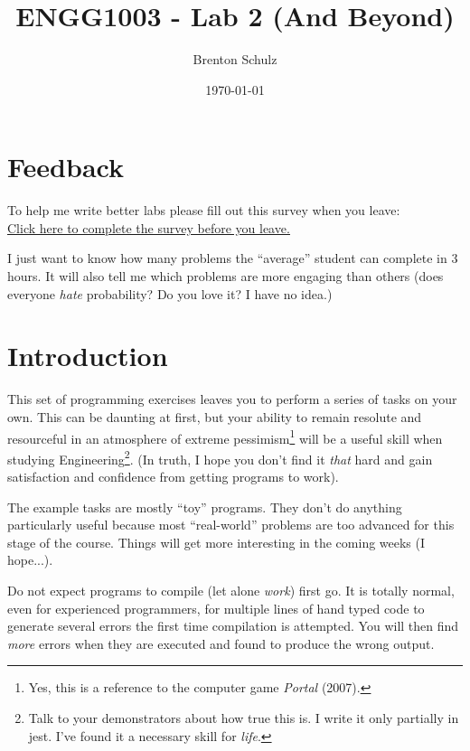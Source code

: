 \documentclass{lab}
\title{ENGG1003 - Lab 2 (And Beyond)}
\author{Brenton Schulz}
\date{\today}
\begin{document}
\maketitle

\section{Feedback}

To help me write better labs please fill out this survey when you leave:
\vspace{5mm} \\ 
\huge{\underline{\href{https://docs.google.com/forms/d/1wUgJlZGRcYm7_ZKBOxzc3DHkZv5UVqKQJ_EGQhSV55Q/}{Click here to complete the survey before you leave.}}}\\
\vspace{2mm}
\normalsize

I just want to know how many problems the ``average'' student can complete in 3 hours. It will also tell me which problems are more engaging than others (does everyone \textit{hate} probability? Do you love it? I have no idea.)

\section{Introduction}

This set of programming exercises leaves you to perform a series of tasks on your own. This can be daunting at first, but your ability to remain resolute and resourceful in an atmosphere of extreme pessimism\footnote{Yes, this is a reference to the computer game \textit{Portal} (2007).} will be a useful skill when studying Engineering\footnote{Talk to your demonstrators about how true this is. I write it only partially in jest. I've found it a necessary skill for \textit{life}.}. (In truth, I hope you don't find it \textit{that} hard and gain satisfaction and confidence from getting programs to work).

The example tasks are mostly ``toy'' programs. They don't do anything particularly useful because most ``real-world'' problems are too advanced for this stage of the course. Things will get more interesting in the coming weeks (I hope...).

Do not expect programs to compile (let alone \textit{work}) first go. It is totally normal, even for experienced programmers, for multiple lines of hand typed code to generate several errors the first time compilation is attempted. You will then find \textit{more} errors when they are executed and found to produce the wrong output.
\end{document}
